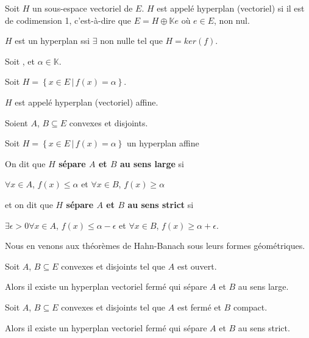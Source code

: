 \begin{definition} [Hyperplan]
	Soit $H$ un sous-espace vectoriel de $E$. $H$ est appelé hyperplan
	(vectoriel) si il est de codimension 1, c'est-à-dire que $E = H\oplus
	\mathbb{K}e$ où $e \in E$, non nul.
\end{definition}

\begin{proposition}
	$H$ est un hyperplan ssi $\exists$  non nulle
	tel que $H = ker(f)$.
\end{proposition}

\begin{definition} 
	Soit , et $\alpha \in \mathbb{K}$.
	
	Soit $H = \left\{ x \in E \, | \, f(x) = \alpha \right\}$.

	$H$ est appelé hyperplan (vectoriel) affine.
\end{definition}


\begin{definition}
	Soient $A$, $B \subseteq E$ convexes et disjoints.
	
	Soit $H = \left\{ x \in E \, | \, f(x) = \alpha\right\}$ un hyperplan affine

	On dit que \textbf{$H$ sépare $A$ et $B$ au sens large} si

	$\forall x \in A$, $f(x) \leq \alpha$ et $\forall x \in B$, $f(x) \geq
	\alpha$

	et on dit que \textbf{$H$ sépare $A$ et $B$ au sens strict} si

	$\exists \epsilon > 0 \forall x \in A$, $f(x) \leq \alpha -
	\epsilon$ et $\forall x \in B$, $f(x) \geq \alpha + \epsilon$.

\end{definition}


Nous en venons aux théorèmes de Hahn-Banach sous leurs formes géométriques.

\begin{theorem} 
	Soit $A$, $B \subseteq E$ convexes et disjoints tel que $A$ est ouvert.

	Alors il existe un hyperplan vectoriel fermé qui sépare $A$ et $B$ au sens
	large.
\end{theorem}

\begin{theorem} 
	Soit $A$, $B \subseteq E$ convexes et disjoints tel que $A$ est fermé et $B$
	compact.

	Alors il existe un hyperplan vectoriel fermé qui sépare $A$ et $B$ au sens
	strict.
\end{theorem}

